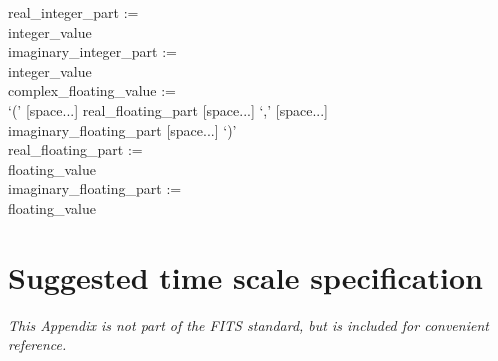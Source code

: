 \documentclass[onecolumn]{aa}
\begin{document}
real\_integer\_part :=   \\ \null \hspace{0.5in}
	integer\_value \\

imaginary\_integer\_part :=   \\ \null \hspace{0.5in}
	integer\_value \\

complex\_floating\_value :=   \\ \null \hspace{0.5in}
	`(' [space...] real\_floating\_part [space...] `,' 
	[space...]    \\ \null \hspace{0.5in}
	imaginary\_floating\_part [space...] `)' \\

real\_floating\_part :=   \\ \null \hspace{0.5in}
	floating\_value \\

imaginary\_floating\_part :=   \\ \null \hspace{0.5in}
	floating\_value \\



\section{Suggested time scale specification}
\label{s:tsys} 
   {\em This Appendix is not part of the {\em FITS\/} standard, 
   but is included
   for convenient reference.}
\end{document}
